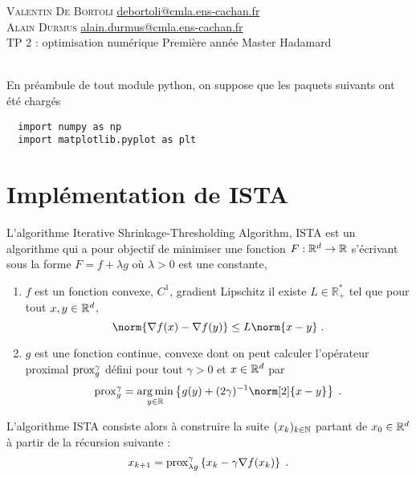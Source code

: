 \documentclass[a4paper,french,12pt]{article}
\begin{document}
\noindent
 \textsc{Valentin De Bortoli} \hfill \url{debortoli@cmla.ens-cachan.fr} \\
    \textsc{Alain Durmus} \hfill \url{alain.durmus@cmla.ens-cachan.fr}
    \\
    TP 2 : optimisation numérique\hfill
    Première année Master Hadamard\\
\hrulefill\ \\
    
 \vspace{-5cm} 


En préambule de tout module python, on suppose que les paquets suivants ont été chargés
\begin{lstlisting}
  import numpy as np
  import matplotlib.pyplot as plt
\end{lstlisting}

\section{Implémentation de ISTA}
\label{sec:impl-de-ista}
L'algorithme Iterative Shrinkage-Thresholding Algorithm, ISTA \cite{beck09_fast_iterat_shrin_thres_algor} est un
algorithme qui a pour objectif de minimiser une fonction $F : \mathbb{R}^d \to \mathbb{R}$ s'écrivant sous la
forme $F = f + \lambda g$ où $\lambda >0$ est une constante, 
\begin{enumerate}
\item $f$ est un fonction convexe, $C^1$, gradient Lipschitz \ie il existe $L\in \mathbb{R}_+^*$ tel que  pour
  tout $x,y \in \mathbb{R}^d$,
  \begin{equation*}
    \norm{\nabla f(x) - \nabla f(y) } \leq L \norm{x-y } \eqsp.
  \end{equation*}
\item $g$ est une fonction continue, convexe dont on peut calculer l'opérateur proximal $\operatorname{prox}_g^{\gamma}$ défini pour tout $\gamma >0$ et $x \in \mathbb{R}^d$ par
  \begin{equation*}
    \prox_g^{\gamma}  = \argmin_{y \in \rset} \defEns{g(y) + (2 \gamma)^{-1} \norm[2]{x-y}} \eqsp.
  \end{equation*}
\end{enumerate}

L'algorithme ISTA consiste alors à construire la suite
$(x_k)_{k \in \mathbb{N}}$ partant de $x_0 \in \mathbb{R}^d$ à partir de la récursion suivante :
\begin{equation*}
  x_{k+1} = \operatorname{prox}_{\lambda g}^{\gamma} \left\lbrace x_k - \gamma \nabla f(x_k) \right\rbrace \;.
\end{equation*}
\end{document}
